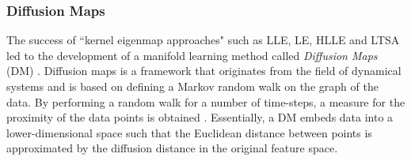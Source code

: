 \subsubsection{Diffusion Maps} \label{sec:Diffusion_Maps}
The success of ``kernel eigenmap approaches" such as LLE, LE, HLLE and LTSA led to the development of a manifold learning method called \textit{Diffusion Maps} (DM) \citep{Coifman2006DiffusionMaps}.  Diffusion maps is a framework that originates from the field of dynamical systems and is based on defining a Markov random walk on the graph of the data.  By performing a random walk for a number of time-steps, a measure for the proximity of the data points is obtained \citep{VanDerMaaten2009DRReview}. Essentially, a DM embeds data into a lower-dimensional space such that the Euclidean distance between points is approximated by the diffusion distance in the original feature space.

